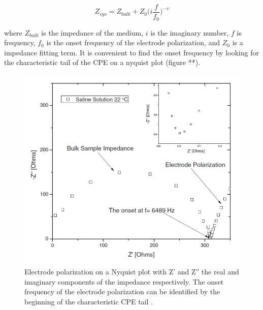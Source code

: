 \begin{equation}
    Z_{sys} = Z_{bulk} + Z_0\bigg(i\frac{f}{f_0}\bigg)^{-v}
\end{equation}

\noindent where $Z_{bulk}$ is the impedance of the medium, $i$ is the imaginary number, $f$ is frequency, $f_0$ is the onset frequency of the electrode polarization, and $Z_0$ is a impedance fitting term. It is convenient to find the onset frequency by looking for the characteristic tail of the CPE on a nyquist plot (figure **).

\begin{figure}[h]
    \centering
    \includegraphics[width=\textwidth]{images/nyquist_ep_onset.png}
    \caption[Electrode polarization on a Nyquist plot]{Electrode polarization on a Nyquist plot with Z' and Z'' the real and imaginary components of the impedance respectively. The onset frequency of the electrode polarization can be identified by the beginning of the characteristic CPE tail \cite{ishai_assessment_2012}.}
    \label{fig:my_label}
\end{figure}


 
 